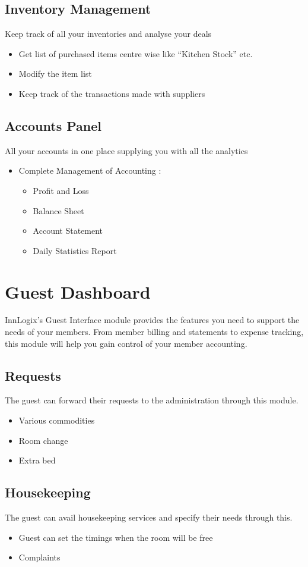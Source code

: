 \documentclass{scrreprt}
\begin{document}
\subsection{Inventory Management}
Keep track of all your inventories and analyse your deals
\begin{itemize}
\item Get list of purchased items centre wise like “Kitchen Stock” etc.
\item Modify the item list
\item Keep track of the transactions made with suppliers
\end{itemize}

\subsection{Accounts Panel}
All your accounts in one place supplying you with all the analytics
\begin{itemize}
    \item Complete Management of Accounting :
\begin{itemize}
    \item Profit and Loss
    \item Balance Sheet
    \item Account Statement
    \item Daily Statistics Report
\end{itemize}
\end{itemize}

\section{Guest Dashboard}
InnLogix’s Guest Interface module provides the features you need to support the needs of your members. From member billing and statements to expense tracking, this module will help you gain control of your member accounting.

\subsection{Requests}
The guest can forward their requests to the administration through this module.
\begin{itemize}
\item Various commodities
\item Room change
\item Extra bed
\end{itemize}

\subsection{Housekeeping}
The guest can avail housekeeping services and specify their needs through this.
\begin{itemize}
    \item Guest can set the timings when the room will be free
    \item Complaints
\end{itemize}
\end{document}
